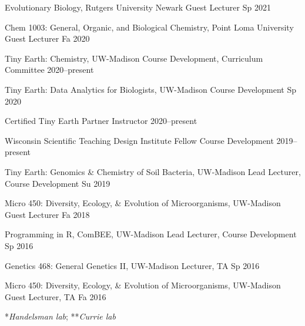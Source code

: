 


\begin{cvhonors}

\cvhonor
{Evolutionary Biology, Rutgers University Newark}
{Guest Lecturer}
{Sp 2021}

\cvhonor
{Chem 1003: General, Organic, and Biological Chemistry, Point Loma University}
{Guest Lecturer}
{Fa 2020}

\cvhonor
{Tiny Earth: Chemistry, UW-Madison}
{Course Development, Curriculum Committee}
{2020--present}

\cvhonor
{Tiny Earth: Data Analytics for Biologists, UW-Madison}
{Course Development}
{Sp 2020}

\cvhonor
{Certified Tiny Earth Partner Instructor}
{}
{2020--present}

\cvhonor
{Wisconsin Scientific Teaching Design Institute Fellow}
{Course Development}
{2019--present}

\cvhonor
{Tiny Earth: Genomics \& Chemistry of Soil Bacteria, UW-Madison}
{Lead Lecturer, Course Development}
{Su 2019}

\cvhonor
{Micro 450: Diversity, Ecology, \& Evolution of Microorganisms, UW-Madison}
{Guest Lecturer}
{Fa 2018}

\cvhonor
{Programming in R, ComBEE, UW-Madison}
{Lead Lecturer, Course Development}
{Sp 2016}

\cvhonor
{Genetics 468: General Genetics II, UW-Madison}
{Lecturer, TA}
{Sp 2016}

\cvhonor
{Micro 450: Diversity, Ecology, \& Evolution of Microorganisms, UW-Madison}
{Guest Lecturer, TA}
{Fa 2016}

\end{cvhonors}

\vspace{1.5mm}


\vspace{-1.5mm}

\begin{cvpubs}

\cvpub
{\hspace{-1cm} *\textit{Handelsman lab}; **\textit{Currie lab}}
{}

\end{cvpubs}

